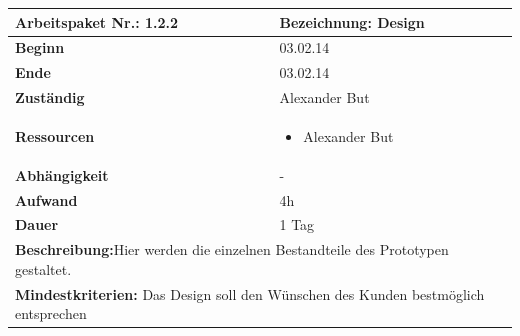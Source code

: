 \documentclass[fontsize=12pt,paper=a4,twoside]{scrartcl}
\begin{document}
\begin{verbatim} 
\end{verbatim}

\begin{tabular}{|p{5.3cm}|p{9.7cm}|}\hline
	\textbf{Arbeitspaket Nr.:} 1.2.2 & \textbf{Bezeichnung:} Design\\ \hline \hline
	\textbf{Beginn} & 03.02.14\\ \hline
	\textbf{Ende} & 03.02.14\\ \hline
	\textbf{Zuständig} & Alexander But\\ \hline
	\textbf{Ressourcen} & \begin{itemize}
		\item Alexander But
	\end{itemize}    \\ \hline
	\textbf{Abhängigkeit} & -\\ \hline
	\textbf{Aufwand} & 4h\\ \hline
	\textbf{Dauer} & 1 Tag\\ \hline
	\multicolumn{2}{|p{15cm}|}{\textbf{Beschreibung:}Hier werden die einzelnen Bestandteile des Prototypen gestaltet.\newline   }\\ \hline
	\multicolumn{2}{|p{15cm}|}{\textbf{Mindestkriterien:} Das Design soll den Wünschen des Kunden bestmöglich entsprechen\newline }\\ \hline
	
\end{tabular}
\begin{verbatim} 

\end{verbatim}
\end{document}
